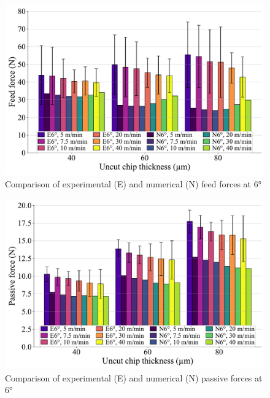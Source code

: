 \documentclass[final,5p,times,twocolumn]{elsarticle}
\begin{document}
\begin{figure}[h]
\centering
\includegraphics{Figures/Fy_6}
\caption{Comparison of experimental (E) and numerical (N) feed forces at 6°}
\label{Fy_6}
\end{figure}

\begin{figure}[h]
\centering
\includegraphics{Figures/Fz_6}
\caption{Comparison of experimental (E) and numerical (N) passive forces at 6°}
\label{Fz_6}
\end{figure}
\end{document}
